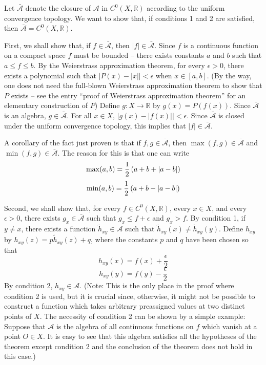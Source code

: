 \documentclass[12pt]{article}
\begin{document}
Let $\bar{\mathcal{A}}$ denote the closure of $\mathcal{A}$ in $C^0 (X, \mathbb{R})$ according to the uniform convergence topology.  We want to show that, if conditions 1 and 2 are satisfied, then  $\bar{\mathcal{A}} = C^0 (X, \mathbb{R})$.

First, we shall show that, if $f \in \bar{\mathcal{A}}$, then $|f| \in \bar{\mathcal{A}}$.  Since $f$ is a continuous function on a compact space $f$ must be bounded -- there exists constants $a$ and $b$ such that $a \le f \le b$.  By the Weierstrass approximation theorem, for every $\epsilon > 0$, there exists a polynomial such that $|P(x) - |x|| < \epsilon$ when $x \in [a,b]$.  (By the way, one does not need the full-blown Weierstrass approximation theorem to show that $P$ exists -- see the entry ``proof of Weierstrass approximation theorem'' for an elementary construction of $P$)  Define $g: X \to \mathbb{R}$ by $g(x) = P(f(x))$.  Since $\bar{\mathcal{A}}$ is an algebra, $g \in \bar{\mathcal{A}}$.  For all $x \in X$, $|g(x) - |f(x)|| < \epsilon$.  Since $\bar{\mathcal{A}}$ is closed under the uniform convergence topology, this implies that $|f| \in \bar{\mathcal{A}}$.

A corollary of the fact just proven is that if $f,g \in \bar{\mathcal{A}}$, then $\max (f,g) \in \bar{\mathcal{A}}$ and $\min (f,g) \in \bar{\mathcal{A}}$.   The reason for this is that one can write
 $$\max (a,b) = {1 \over 2} \left( a+b + |a-b| \right)$$
 $$\min (a,b) = {1 \over 2} \left( a+b - |a-b| \right)$$

Second, we shall show that, for every $f \in C^0 (X, \mathbb{R})$, every $x \in X$, and every $\epsilon > 0$, there exists $g_x \in \bar{\mathcal{A}}$ such that $g_x \le f + \epsilon$ and $g_x > f$.  By condition 1, if $y \neq x$, there exists a function ${\tilde h}_{xy} \in \mathcal{A}$ such that ${\tilde h}_{xy} (x) \ne {\tilde h}_{xy} (y)$.  Define
$h_{xy}$ by $h_{xy} (z) = p {\tilde h}_{xy} (z) + q$, where the constants $p$ and $q$ have been chosen so that
 $$h_{xy} (x) = f(x) + \frac{\epsilon}{2}$$
 $$h_{xy} (y) = f(y) - \frac{\epsilon}{2}$$
By condition 2, $h_{xy} \in \mathcal{A}$.  (Note: This is the only place in the proof where condition 2 is used, but it is crucial since, otherwise, it might not be possible to construct a function which takes arbitrary preassigned values at two distinct points of $X$.  The necessity of condition 2 can be shown by a simple example:  Suppose that $\mathcal{A}$ is the algebra of all continuous functions on $f$ which vanish at a point $O \in X$.  It is easy to see that this algebra satisfies all the hypotheses of the theorem except condition 2 and the conclusion of the theorem 
does not hold in this case.)
\end{document}
